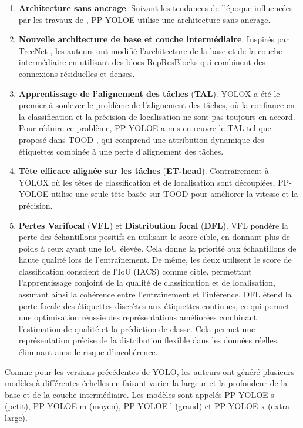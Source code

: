 \documentclass{article}
\begin{document}
\begin{enumerate}
    \item \textbf{Architecture sans ancrage}. Suivant les tendances de l'époque influencées par les travaux de \cite{81,80,79,78}, PP-YOLOE utilise une architecture sans ancrage.
    \item \textbf{Nouvelle architecture de base et couche intermédiaire}. Inspirés par TreeNet \cite{107}, les auteurs ont modifié l'architecture de la base et de la couche intermédiaire en utilisant des blocs RepResBlocks qui combinent des connexions résiduelles et denses.
    \item \textbf{Apprentissage de l'alignement des tâches} (\textbf{TAL}). YOLOX a été le premier à soulever le problème de l'alignement des tâches, où la confiance en la classification et la précision de localisation ne sont pas toujours en accord. Pour réduire ce problème, PP-YOLOE a mis en œuvre le TAL tel que proposé dans TOOD \cite{88}, qui comprend une attribution dynamique des étiquettes combinée à une perte d'alignement des tâches.
    \item \textbf{Tête efficace alignée sur les tâches} (\textbf{ET-head}). Contrairement à YOLOX où les têtes de classification et de localisation sont découplées, PP-YOLOE utilise une seule tête basée sur TOOD pour améliorer la vitesse et la précision.
    \item \textbf{Pertes Varifocal} (\textbf{VFL}) et \textbf{Distribution focal} (\textbf{DFL}). VFL \cite{89} pondère la perte des échantillons positifs en utilisant le score cible, en donnant plus de poids à ceux ayant une IoU élevée. Cela donne la priorité aux échantillons de haute qualité lors de l'entraînement. De même, les deux utilisent le score de classification conscient de l'IoU (IACS) comme cible, permettant l'apprentissage conjoint de la qualité de classification et de localisation, assurant ainsi la cohérence entre l'entraînement et l'inférence. DFL \cite{108} étend la perte focale des étiquettes discrètes aux étiquettes continues, ce qui permet une optimisation réussie des représentations améliorées combinant l'estimation de qualité et la prédiction de classe. Cela permet une représentation précise de la distribution flexible dans les données réelles, éliminant ainsi le risque d'incohérence.
\end{enumerate}

Comme pour les versions précédentes de YOLO, les auteurs ont généré plusieurs modèles à différentes échelles en faisant varier la largeur et la profondeur de la base et de la couche intermédiaire. Les modèles sont appelés PP-YOLOE-s (petit), PP-YOLOE-m (moyen), PP-YOLOE-l (grand) et PP-YOLOE-x (extra large).
\end{document}
